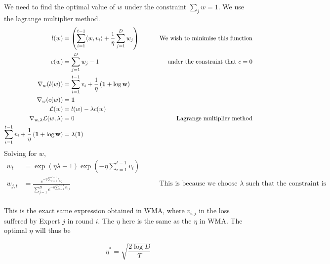 \documentclass{article}
\begin{document}
We need to find the optimal value of $w$ under the constraint $\sum_j w = 1$. We use the lagrange multiplier method.
\begin{align*}
    l(w) &= \left( \sum_{i=1}^{t-1} \langle w,v_i \rangle + \frac{1}{\eta} \sum_{j=1}^{D} w_j \right)\ &\qquad \text{We wish to minimise this function}\\
    c(w) &= \sum_{j=1}^{D} w_j - 1 &\qquad \text{under the constraint that $c=0$}\\
    \nabla_w(l(w)) &=\sum_{i=1}^{t-1} v_i + \frac{1}{\eta}\left( \bf{1} + \log w \right) \\
    \nabla_w(c(w)) &= \bf{1}\\
    \mathcal{L}(w) &= l(w) - \lambda c(w) \\
    \nabla_{w,\lambda}\mathcal{L}(w,\lambda) &= 0  &\qquad \text{Lagrange multiplier method}\\
    \sum_{i=1}^{t-1} v_i + \frac{1}{\eta}\left( \bf{1} + \log w \right) &= \lambda(\bf{1})
\end{align*}
Solving for $w$,
\begin{align*}
    w_t &= \exp (\eta \lambda - 1) \exp (-\eta \sum_{i=1}^{t-1}v_i)\\
    w_{j,t}    &= \frac{e^{-\eta \sum_{i=1}^{t-1}v_{i,j}}}{\sum_{j=1}^{D}e^{-\eta \sum_{i=1}^{t-1}v_{i,j}}} &\qquad \text{This is because we choose $\lambda$ such that the constraint is satisfied}\\
\end{align*}

This is the exact same expression obtained in WMA, where $v_{i,j}$ in the loss suffered by Expert $j$ in round $i$. The $\eta$ here is the same as the $\eta$ in WMA. The optimal $\eta$ will thus be

\[
    \eta^* = \sqrt{\frac{2 \log D}{T}}
    \]

\newpage
\end{document}
